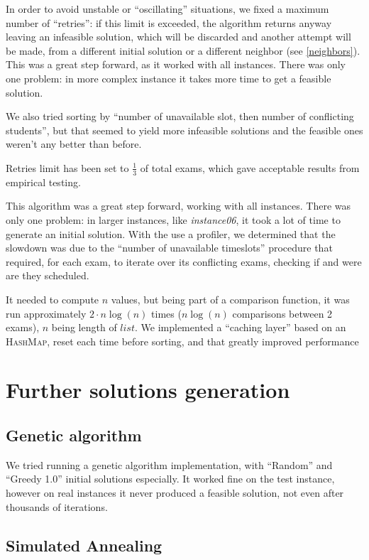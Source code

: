 \documentclass[11pt, a4paper, leqno]{article}
\begin{document}
	In order to avoid unstable or ``oscillating'' situations, we fixed a maximum number of ``retries'': if this limit is exceeded, the algorithm returns anyway leaving an infeasible solution, which will be discarded and another attempt will be made, from a different initial solution or a different neighbor (see \ref{neighbors}). This was a great step forward, as it worked with all instances. There was only one problem: in more complex instance it takes more time to get a feasible solution.
	
	We also tried sorting by ``number of unavailable slot, then number of conflicting students'', but that seemed to yield more infeasible solutions and the feasible ones weren't any better than before.
	
	Retries limit has been set to $\frac{1}{3}$ of total exams, which gave acceptable results from empirical testing.
	
	This algorithm was a great step forward, working with all instances. There was only one problem: in larger instances, like \textit{instance06}, it took a lot of time to generate an initial solution. With the use a profiler, we determined that the slowdown was due to the ``number of unavailable timeslots'' procedure that required, for each exam, to iterate over its conflicting exams, checking if and were are they scheduled.
	
	It needed to compute $n$ values, but being part of a comparison function, it was run approximately $2\cdot n \log(n)$ times ($n \log(n)$ comparisons between 2 exams), $n$ being length of $list$. We implemented a ``caching layer'' based on an \textsc{HashMap}, reset each time before sorting, and that greatly improved performance
	
	\section{Further solutions generation}
	
	\subsection{Genetic algorithm}
	We tried running a genetic algorithm implementation, with ``Random'' and ``Greedy 1.0'' initial solutions especially. It worked fine on the test instance, however on real instances it never produced a feasible solution, not even after thousands of iterations.
	
	\subsection{Simulated Annealing}
	
\end{document}
